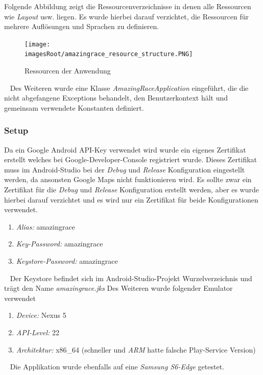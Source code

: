 \documentclass[11pt, a4paper, twoside]{article}   	%
\newcommand{\imagesRoot}{images}
\begin{document}
Folgende Abbildung zeigt die Ressourcenverzeichnisse in denen alle Ressourcen wie \emph{Layout} usw. liegen. Es wurde hierbei darauf verzichtet, die Ressourcen für mehrere Auflösungen und Sprachen zu definieren.
\begin{figure}[h]
	\centering
	\texttt{[image: \\imagesRoot/amazingrace\_resource\_structure.PNG]}
	\caption
	{Ressourcen der Anwendung}
\end{figure}
\ \newline
Des Weiteren wurde eine Klasse \emph{AmazingRaceApplication} eingeführt, die die nicht abgefangene Exceptions behandelt, den Benutzerkontext hält und gemeinsam verwendete Konstanten definiert.
\newline
\subsubsection{Setup}
Da ein Google Android API-Key verwendet wird wurde ein eigenes Zertifikat erstellt welches bei Google-Developer-Console registriert wurde. Dieses Zertifikat muss im Android-Studio bei der \emph{Debug} und \emph{Release} Konfiguration eingestellt werden, da ansonsten Google Maps nicht funktionieren wird. Es sollte zwar ein Zertifikat für die \emph{Debug} und \emph{Release} Konfiguration erstellt werden, aber es wurde hierbei darauf verzichtet und es wird nur ein Zertifikat für beide Konfigurationen verwendet.
\begin{enumerate}
	\item\emph{Alias:} amazingrace
	\item\emph{Key-Password:} amazingrace
	\item\emph{Keystore-Password:} amazingrace
\end{enumerate}
\ \newline
Der Keystore befindet sich im Android-Studio-Projekt Wurzelverzeichnis und trägt den Name \emph{amazingrace.jks}
\newline
\newline
Des Weiteren wurde folgender Emulator verwendet
\begin{enumerate}
	\item\emph{Device:} Nexus 5
	\item\emph{API-Level:} 22
	\item\emph{Architektur:} x86\_64 (schneller und \emph{ARM}  hatte falsche Play-Service Version)
\end{enumerate}
\ \newline
Die Applikation wurde ebenfalls auf eine \emph{Samsung S6-Edge} getestet.
\newpage
\end{document}
